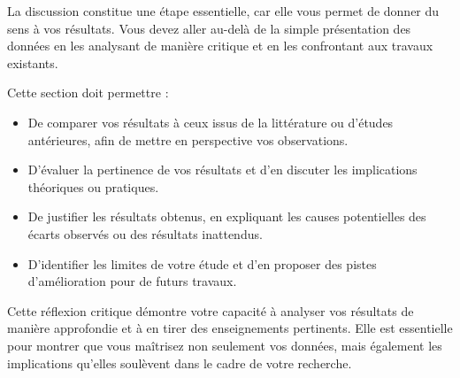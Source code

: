 La discussion constitue une étape essentielle, car elle vous permet de donner du sens à vos résultats. Vous devez aller au-delà de la simple présentation des données en les analysant de manière critique et en les confrontant aux travaux existants.

Cette section doit permettre :
\begin{itemize}
    \item De comparer vos résultats à ceux issus de la littérature ou d'études antérieures, afin de mettre en perspective vos observations.
    \item D'évaluer la pertinence de vos résultats et d'en discuter les implications théoriques ou pratiques.
    \item De justifier les résultats obtenus, en expliquant les causes potentielles des écarts observés ou des résultats inattendus.
    \item D'identifier les limites de votre étude et d'en proposer des pistes d'amélioration pour de futurs travaux.
\end{itemize}

Cette réflexion critique démontre votre capacité à analyser vos résultats de manière approfondie et à en tirer des enseignements pertinents. Elle est essentielle pour montrer que vous maîtrisez non seulement vos données, mais également les implications qu'elles soulèvent dans le cadre de votre recherche.
